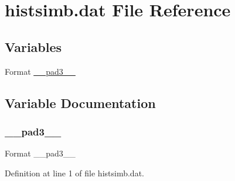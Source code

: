 \hypertarget{histsimb_8dat}{}\section{histsimb.\+dat File Reference}
\label{histsimb_8dat}
\subsection*{Variables}
\begin{DoxyCompactItemize}
\item 
Format \hyperlink{histsimb_8dat_a635218d1d12627ef1a202e84c2df29ca}{\+\_\+\+\_\+pad3\+\_\+\+\_\+}
\end{DoxyCompactItemize}


\subsection{Variable Documentation}
\mbox{\label{histsimb_8dat_a635218d1d12627ef1a202e84c2df29ca}} 
\subsubsection{\texorpdfstring{\+\_\+\+\_\+pad3\+\_\+\+\_\+}{\_\_pad3\_\_}}
{\footnotesize\ttfamily Format \+\_\+\+\_\+pad3\+\_\+\+\_\+}



Definition at line 1 of file histsimb.\+dat.

